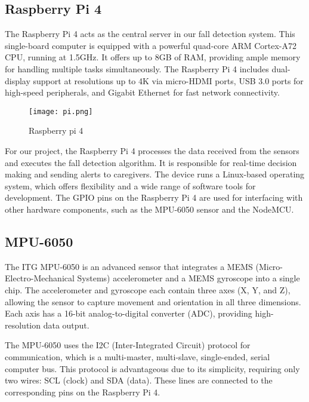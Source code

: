 \documentclass[final,5p,times,twocolumn,authoryear]{elsarticle}
\begin{document}
\subsection{Raspberry Pi 4}

The Raspberry Pi 4 acts as the central server in our fall detection system. This single-board computer is equipped with a powerful quad-core ARM Cortex-A72 CPU, running at 1.5GHz. It offers up to 8GB of RAM, providing ample memory for handling multiple tasks simultaneously. The Raspberry Pi 4 includes dual-display support at resolutions up to 4K via micro-HDMI ports, USB 3.0 ports for high-speed peripherals, and Gigabit Ethernet for fast network connectivity. 

\begin{figure}
    \centering
    \texttt{[image: pi.png]}
    \caption{Raspberry pi 4}
    \label{fig:enter-label}
\end{figure}

For our project, the Raspberry Pi 4 processes the data received from the sensors and executes the fall detection algorithm. It is responsible for real-time decision making and sending alerts to caregivers. The device runs a Linux-based operating system, which offers flexibility and a wide range of software tools for development. The GPIO pins on the Raspberry Pi 4 are used for interfacing with other hardware components, such as the MPU-6050 sensor and the NodeMCU. 



\subsection{MPU-6050}

The ITG MPU-6050 is an advanced sensor that integrates a MEMS (Micro-Electro-Mechanical Systems) accelerometer and a MEMS gyroscope into a single chip. The accelerometer and gyroscope each contain three axes (X, Y, and Z), allowing the sensor to capture movement and orientation in all three dimensions. Each axis has a 16-bit analog-to-digital converter (ADC), providing high-resolution data output. 

The MPU-6050 uses the I2C (Inter-Integrated Circuit) protocol for communication, which is a multi-master, multi-slave, single-ended, serial computer bus. This protocol is advantageous due to its simplicity, requiring only two wires: SCL (clock) and SDA (data). These lines are connected to the corresponding pins on the Raspberry Pi 4. 
\end{document}
